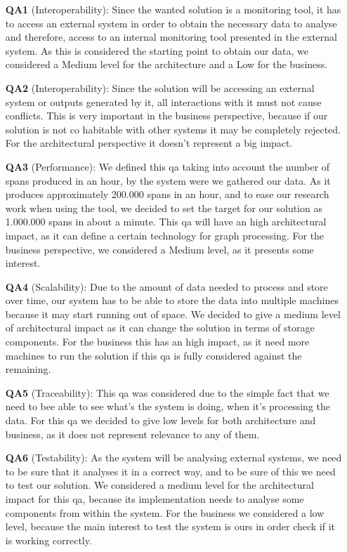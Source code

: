 \begin{itemize}
    \item[\textbf{QA1}] (Interoperability): Since the wanted solution is a monitoring tool, it has to access an external system in order to obtain the necessary data to analyse and therefore, access to an internal monitoring tool presented in the external system. As this is considered the starting point to obtain our data, we considered a Medium level for the architecture and a Low for the business.

    \item[\textbf{QA2}] (Interoperability): Since the solution will be accessing an external system or outputs generated by it, all interactions with it must not cause conflicts. This is very important in the business perspective, because if our solution is not co habitable with other systems it may be completely rejected. For the architectural perspective it doesn't represent a big impact. 
    
    \item[\textbf{QA3}] (Performance): We defined this \gls{qa} taking into account the number of spans produced in an hour, by the system were we gathered our data. As it produces approximately 200.000 spans in an hour, and to ease our research work when using the tool, we decided to set the target for our solution as 1.000.000 spans in about a minute. This \gls{qa} will have an high architectural impact, as it can define a certain technology for graph processing. For the business perspective, we considered a Medium level, as it presents some interest.
    
    \item[\textbf{QA4}] (Scalability): Due to the amount of data needed to process and store over time, our system has to be able to store the data into multiple machines because it may start running out of space. We decided to give a medium level of architectural impact as it can change the solution in terms of storage components. For the business this has an high impact, as it need more machines to run the solution if this \gls{qa} is fully considered against the remaining.
    
    \item[\textbf{QA5}] (Traceability): This \gls{qa} was considered due to the simple fact that we need to bee able to see what's the system is doing, when it's processing the data. For this \gls{qa} we decided to give low levels for both architecture and business, as it does not represent relevance to any of them.
    
    \item[\textbf{QA6}] (Testability): As the system will be analysing external systems, we need to be sure that it analyses it in a correct way, and to be sure of this we need to test our solution. We considered a medium level for the architectural impact for this \gls{qa}, because its implementation needs to analyse some components from within the system. For the business we considered a low level, because the main interest to test the system is ours in order check if it is working correctly.
\end{itemize}


